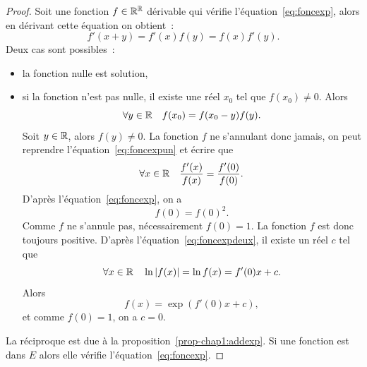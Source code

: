 \begin{proof}
  Soit une fonction $f \in \mathbb{R}^{\mathbb{R}}$ dérivable qui vérifie l'équation~\eqref{eq:foncexp}, alors en dérivant cette équation on obtient~:
  \begin{equation}
    \label{eq:foncexpun}
    f'(x+y)=f'(x)f(y)=f(x)f'(y).
  \end{equation}
  Deux cas sont possibles~:
  \begin{itemize}
  \item la fonction nulle est solution,
  \item si la fonction n'est pas nulle, il existe une réel $x_0$ tel que $f(x_0) \neq 0$. Alors
    \begin{equation}
      \forall y \in \mathbb{R} \quad f(x_0)= f(x_0-y)f(y).
    \end{equation}
    Soit $y \in \mathbb{R}$, alors $f(y) \neq 0$. La fonction $f$ ne s'annulant donc jamais, on peut reprendre l'équation~\ref{eq:foncexpun} et écrire que
    \begin{equation}
      \label{eq:foncexpdeux}
      \forall x \in \mathbb{R} \quad \frac{f'(x)}{f(x)}=\frac{f'(0)}{f(0)}.
    \end{equation}
    D'après l'équation~\ref{eq:foncexp}, on a
    \begin{equation}
      f(0)=f(0)^2.
    \end{equation}
    Comme $f$ ne s'annule pas, nécessairement $f(0)=1$. La fonction $f$ est donc toujours positive. D'après l'équation~\eqref{eq:foncexpdeux}, il existe un réel $c$ tel que
    \begin{equation}
      \forall x \in \mathbb{R} \quad \ln \left\lvert f(x)\right\rvert=\ln f(x)=f'(0) x + c.
    \end{equation}
    Alors
    \begin{equation}
      f(x)=\exp(f'(0) x +c),
    \end{equation}
    et comme $f(0)=1$, on a $c=0$.
  \end{itemize}
  La réciproque est due à la proposition~\ref{prop-chap1:addexp}. Si une fonction est dans $E$ alors elle vérifie l'équation~\ref{eq:foncexp}.
\end{proof}
%
